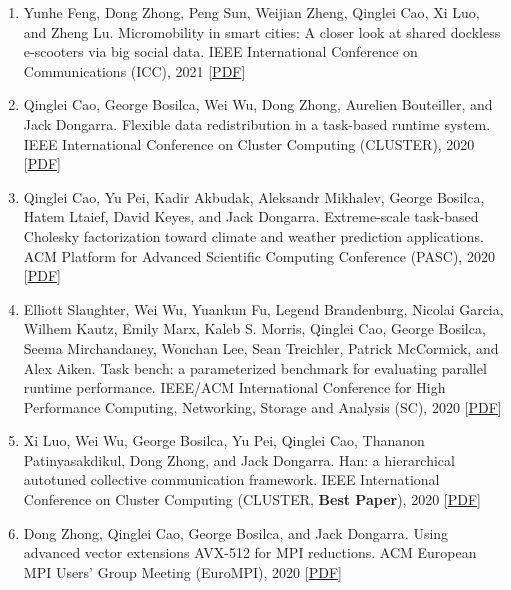\documentclass{resume} %
\let\OrigRSection\rSection
\let\OrigEndRSection\endrSection
\let\OrigMakeUppercase\MakeUppercase
\renewenvironment{rSection}[1]{
    \renewcommand{\MakeUppercase}[1]{\textcolor{blue}{\OrigMakeUppercase{##1}}}%
    \OrigRSection{#1}%
}{%
    \OrigEndRSection%
}
\begin{document}
\begin{rSection}{\faBook~Publications}
\begin{itemize}
\begin{enumerate}[leftmargin=8pt, align=left]
    \item Yunhe Feng, Dong Zhong, Peng Sun, Weijian Zheng, {Qinglei Cao}, Xi Luo, and Zheng Lu. Micromobility in smart cities: A closer look at shared dockless e-scooters via big social data. IEEE International Conference on Communications (ICC), 2021 \hfill[\href{https://qingleicao.com/papers/Micromobility in Smart Cities A Closer Look at Shared Dockless E-Scooters via Big Social Data.pdf}{PDF}]
    \item {Qinglei Cao}, George Bosilca, Wei Wu, Dong Zhong, Aurelien Bouteiller, and Jack Dongarra. Flexible data redistribution in a task-based runtime system. IEEE International Conference on Cluster Computing ({CLUSTER}), 2020 \hfill[\href{https://qingleicao.com/papers/Flexible Data Redistribution in a Task-Based Runtime System.pdf}{PDF}]
    \item Qinglei Cao, Yu Pei, Kadir Akbudak, Aleksandr Mikhalev, George Bosilca, Hatem Ltaief, David Keyes, and Jack Dongarra. Extreme-scale task-based Cholesky factorization toward climate and weather prediction applications. ACM Platform for Advanced Scientific Computing Conference (PASC), 2020 \hfill[\href{https://qingleicao.com/papers/Extreme-Scale Task-Based Cholesky Factorization Toward Climate and Weather Prediction Applications.pdf}{PDF}]
    \item Elliott Slaughter, Wei Wu, Yuankun Fu, Legend Brandenburg, Nicolai Garcia, Wilhem Kautz, Emily Marx, Kaleb S. Morris, {Qinglei Cao}, George Bosilca, Seema Mirchandaney, Wonchan Lee, Sean Treichler, Patrick McCormick, and Alex Aiken. Task bench: a parameterized benchmark for evaluating parallel runtime performance. IEEE/ACM International Conference for High Performance Computing, Networking, Storage and Analysis ({SC}), 2020 \hfill[\href{https://qingleicao.com/papers/Task_Bench_A_Parameterized_Benchmark_for_Evaluating_Parallel_Runtime_Performance.pdf}{PDF}]
    \item Xi Luo, Wei Wu, George Bosilca, Yu Pei, {Qinglei Cao}, Thananon Patinyasakdikul, Dong Zhong, and Jack Dongarra. Han: a hierarchical autotuned collective communication framework. IEEE International Conference on Cluster Computing (CLUSTER, {\bf Best Paper}), 2020 \hfill[\href{https://qingleicao.com/papers/HAN_a_Hierarchical_AutotuNed_Collective_Communication_Framework.pdf}{PDF}]
    \item Dong Zhong, {Qinglei Cao}, George Bosilca, and Jack Dongarra. Using advanced vector extensions AVX-512 for MPI reductions. ACM European MPI Users’ Group Meeting (EuroMPI), 2020 \hfill[\href{https://qingleicao.com/papers/Using advanced vector extensions AVX-512 for MPI reductions.pdf}{PDF}]

\end{enumerate}
\end{itemize}
\end{rSection}
\end{document}
